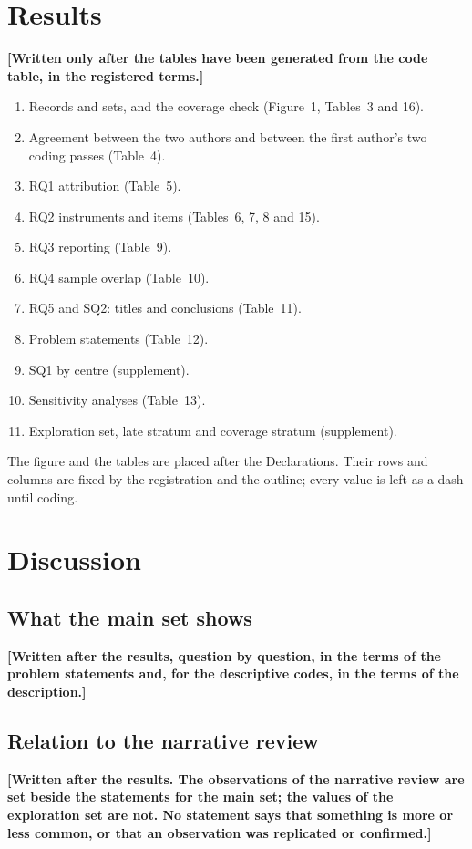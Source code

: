 \documentclass[11pt]{article}
\newcommand{\tbd}[1]{\textbf{[#1]}}
\begin{document}
\section{Results}
\tbd{Written only after the tables have been generated from the code table, in the registered terms.}

\begin{enumerate}
  \item Records and sets, and the coverage check (Figure~1, Tables~3 and 16).
  \item Agreement between the two authors and between the first author's two coding passes (Table~4).
  \item RQ1 attribution (Table~5).
  \item RQ2 instruments and items (Tables~6, 7, 8 and 15).
  \item RQ3 reporting (Table~9).
  \item RQ4 sample overlap (Table~10).
  \item RQ5 and SQ2: titles and conclusions (Table~11).
  \item Problem statements (Table~12).
  \item SQ1 by centre (supplement).
  \item Sensitivity analyses (Table~13).
  \item Exploration set, late stratum and coverage stratum (supplement).
\end{enumerate}

The figure and the tables are placed after the Declarations. Their rows and columns are fixed by the registration
and the outline; every value is left as a dash until coding.

\section{Discussion}

\subsection{What the main set shows}
\tbd{Written after the results, question by question, in the terms of the problem statements and, for the descriptive
codes, in the terms of the description.}

\subsection{Relation to the narrative review}
\tbd{Written after the results. The observations of the narrative review are set beside the statements for the main
set; the values of the exploration set are not. No statement says that something is more or less common, or that an
observation was replicated or confirmed.}
\end{document}
